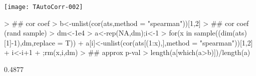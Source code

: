 \documentclass{article}
\begin{document}



\texttt{[image: TAutoCorr-002]}

\begin{Schunk}
\begin{Sinput}
> ## cor coef
> b<-unlist(cor(ats,method = "spearman"))[1,2]
> ## cor coef (rand sample)
> dm<-1e4
> a<-rep(NA,dm);i<-1
> for(x in sample((dim(ats)[1]-1),dm,replace = T)){
+   a[i]<-unlist(cor(ats[(1:x),],method = "spearman"))[1,2]
+   i<-i+1
+   };rm(x,i,dm)
> ## approx p-val
> length(a[which(a>b)])/length(a)
\end{Sinput}
\begin{Soutput}
[1] 0.4877
\end{Soutput}
\end{Schunk}
\end{document}
